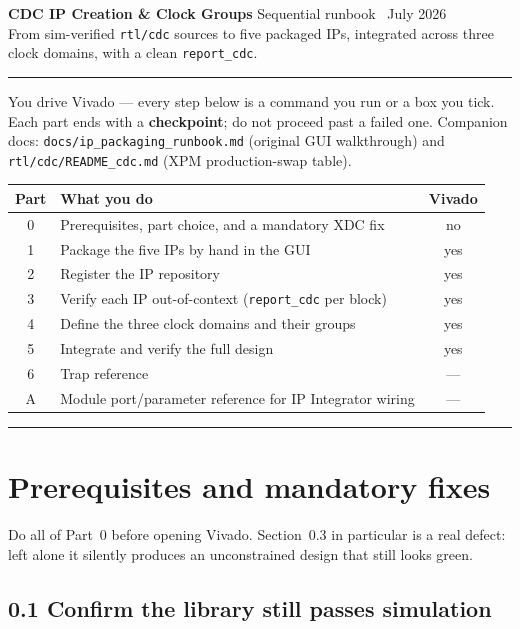 \documentclass[10pt,a4paper]{article}
\newcommand{\hr}{\par\textcolor{rulegray}{\rule{\linewidth}{1pt}}\par}
\newcommand{\code}[1]{\texttt{\small #1}}
\begin{document}
{\LARGE\bfseries\color{fpgablue} CDC IP Creation \& Clock Groups}\hfill
{\small\color{rulegray} Sequential runbook \textbullet\ July 2026}\\[-1pt]
{\large From sim-verified \code{rtl/cdc} sources to five packaged IPs, integrated
across three clock domains, with a clean \code{report\_cdc}.}

\hr

You drive Vivado --- every step below is a command you run or a box you tick. Each
part ends with a \textbf{checkpoint}; do not proceed past a failed one. Companion
docs: \code{docs/ip\_packaging\_runbook.md} (original GUI walkthrough) and
\code{rtl/cdc/README\_cdc.md} (XPM production-swap table).

\begin{center}
\small
\begin{tabular}{@{}clc@{}}
\toprule
\textbf{Part} & \textbf{What you do} & \textbf{Vivado} \\
\midrule
0 & Prerequisites, part choice, and a mandatory XDC fix & no \\
1 & Package the five IPs by hand in the GUI & yes \\
2 & Register the IP repository & yes \\
3 & Verify each IP out-of-context (\code{report\_cdc} per block) & yes \\
4 & Define the three clock domains and their groups & yes \\
5 & Integrate and verify the full design & yes \\
6 & Trap reference & --- \\
A & Module port/parameter reference for IP Integrator wiring & --- \\
\bottomrule
\end{tabular}
\end{center}

\hr

\section{Prerequisites and mandatory fixes}

Do all of Part~0 before opening Vivado. Section~0.3 in particular is a real defect:
left alone it silently produces an unconstrained design that still looks green.

\subsection{0.1 Confirm the library still passes simulation}
\end{document}
